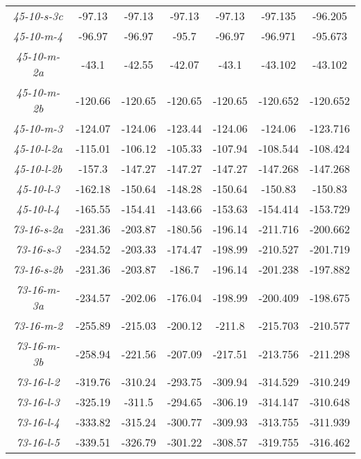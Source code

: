 {\begin{longtable}{ccccccc}
\emph{45-10-s-3c}   &   -97.13  &   -97.13      &   -97.13      &   -97.13      &   -97.135 &   -96.205 \\
\emph{45-10-m-4}    &   -96.97  &   -96.97      &   -95.7       &   -96.97      &   -96.971 &   -95.673 \\
\emph{45-10-m-2a}   &   -43.1   &   -42.55      &   -42.07      &   -43.1       &   -43.102 &   -43.102 \\
\emph{45-10-m-2b}   &   -120.66 &   -120.65     &   -120.65     &   -120.65     &   -120.652    &   -120.652    \\
\emph{45-10-m-3}    &   -124.07 &   -124.06     &   -123.44     &   -124.06     &   -124.06 &   -123.716    \\
\emph{45-10-l-2a}   &   -115.01 &   -106.12     &   -105.33     &   -107.94     &   -108.544    &   -108.424    \\
\emph{45-10-l-2b}   &   -157.3  &   -147.27     &   -147.27     &   -147.27     &   -147.268    &   -147.268    \\
\emph{45-10-l-3}    &   -162.18 &   -150.64     &   -148.28     &   -150.64     &   -150.83 &   -150.83 \\
\emph{45-10-l-4}    &   -165.55 &   -154.41     &   -143.66     &   -153.63     &   -154.414    &   -153.729    \\ \hline
\emph{73-16-s-2a}   &   -231.36 &   -203.87     &   -180.56     &   -196.14     &   -211.716    &   -200.662    \\
\emph{73-16-s-3}    &   -234.52 &   -203.33     &   -174.47     &   -198.99     &   -210.527    &   -201.719    \\
\emph{73-16-s-2b}   &   -231.36 &   -203.87     &   -186.7      &   -196.14     &   -201.238    &   -197.882    \\
\emph{73-16-m-3a}   &   -234.57 &   -202.06     &   -176.04     &   -198.99     &   -200.409    &   -198.675    \\
\emph{73-16-m-2}    &   -255.89 &   -215.03     &   -200.12     &   -211.8      &   -215.703    &   -210.577    \\
\emph{73-16-m-3b}   &   -258.94 &   -221.56     &   -207.09     &   -217.51     &   -213.756    &   -211.298    \\
\emph{73-16-l-2}    &   -319.76 &   -310.24     &   -293.75     &   -309.94     &   -314.529    &   -310.249    \\
\emph{73-16-l-3}    &   -325.19 &   -311.5      &   -294.65     &   -306.19     &   -314.147    &   -310.648    \\
\emph{73-16-l-4}    &   -333.82 &   -315.24     &   -300.77     &   -309.93     &   -313.755    &   -311.939    \\
\emph{73-16-l-5}    &   -339.51 &   -326.79     &   -301.22     &   -308.57     &   -319.755    &   -316.462    \\




\end{longtable}}
